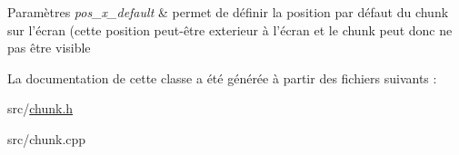 \begin{DoxyParams}{Paramètres}
{\em pos\+\_\+x\+\_\+default} & permet de définir la position par défaut du chunk sur l'écran (cette position peut-\/être exterieur à l'écran et le chunk peut donc ne pas être visible \\
\hline
\end{DoxyParams}


La documentation de cette classe a été générée à partir des fichiers suivants \+:\begin{DoxyCompactItemize}
\item 
src/\hyperlink{chunk_8h}{chunk.\+h}\item 
src/chunk.\+cpp\end{DoxyCompactItemize}
